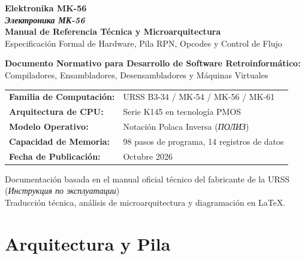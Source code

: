\documentclass[11pt,a4paper]{article}
\begin{document}
\begin{titlepage}
    \centering
    \vspace*{1.5cm}
    
    {\Huge\bfseries\textcolor{darkslate}{Elektronika MK-56}}\\[0.4cm]
    {\LARGE\textbf{\textit{Электроника МК-56}}}\\[1cm]
    
    {\Large\textcolor{techblue}{\textbf{Manual de Referencia Técnica y Microarquitectura}}}\\[0.3cm]
    {\large Especificación Formal de Hardware, Pila RPN, Opcodes y Control de Flujo}\\[1.5cm]
    
    \begin{tcolorbox}[colback=codebg,colframe=darkslate,width=0.85\textwidth,arc=2mm]
    \centering\small\sffamily
    \textbf{Documento Normativo para Desarrollo de Software Retroinformático:}\\
    Compiladores, Ensambladores, Desensambladores y Máquinas Virtuales
    \end{tcolorbox}
    
    \vspace{2cm}
    
    \begin{tabular}{ll}
        \textbf{Familia de Computación:} & URSS B3-34 / MK-54 / MK-56 / MK-61 \\
        \textbf{Arquitectura de CPU:}    & Serie K145 en tecnología PMOS \\
        \textbf{Modelo Operativo:}      & Notación Polaca Inversa (\textit{ПОЛИЗ}) \\
        \textbf{Capacidad de Memoria:}   & 98 pasos de programa, 14 registros de datos \\
        \textbf{Fecha de Publicación:}   & Octubre 2026 \\
    \end{tabular}

    \vfill
    {\small Documentación basada en el manual oficial técnico del fabricante de la URSS (\textit{Инструкция по эксплуатации})\\
    Traducción técnica, análisis de microarquitectura y diagramación en \LaTeX.}
\end{titlepage}

\tableofcontents
\newpage

\section{Arquitectura y Pila}
\end{document}
